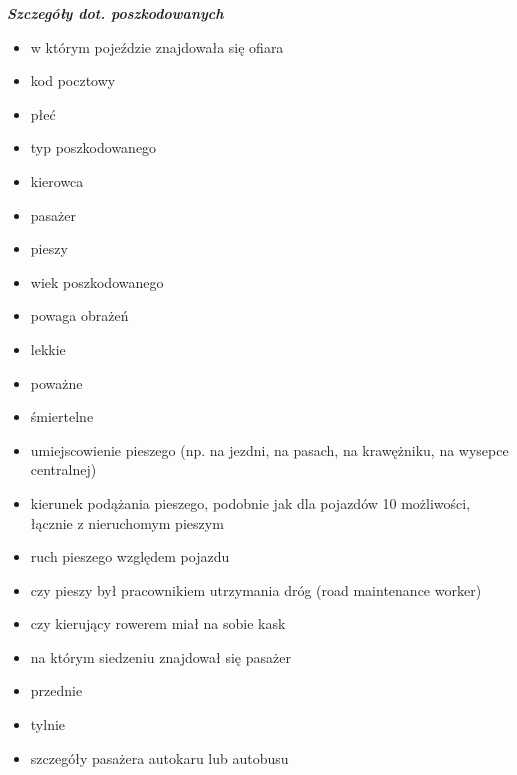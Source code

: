 \textbf{\emph{Szczegóły dot. poszkodowanych}}

\begin{itemize}
\itemsep1pt\parskip0pt
\item
  w którym pojeździe znajdowała się ofiara\\
\item
  kod pocztowy\\
\item
  płeć\\
\item
  typ poszkodowanego\\
\item
  kierowca\\
\item
  pasażer\\
\item
  pieszy\\
\item
  wiek poszkodowanego\\
\item
  powaga obrażeń\\
\item
  lekkie\\
\item
  poważne\\
\item
  śmiertelne\\
\item
  umiejscowienie pieszego (np. na jezdni, na pasach, na krawężniku, na
  wysepce centralnej)\\
\item
  kierunek podążania pieszego, podobnie jak dla pojazdów 10 możliwości,
  łącznie z nieruchomym pieszym\\
\item
  ruch pieszego względem pojazdu\\
\item
  czy pieszy był pracownikiem utrzymania dróg (road maintenance
  worker)\\
\item
  czy kierujący rowerem miał na sobie kask\\
\item
  na którym siedzeniu znajdował się pasażer\\
\item
  przednie\\
\item
  tylnie\\
\item
  szczegóły pasażera autokaru lub autobusu\\

\end{itemize}
